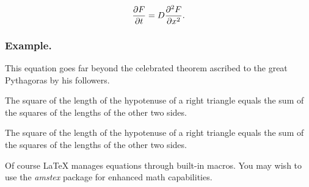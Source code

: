 \documentclass{ifacconf}
\begin{document}
\begin{equation} \label{eq:sample}
{{\partial F}\over {\partial t}} = D{{\partial^2 F}\over {\partial x^2}}.
\end{equation}

\subsubsection{Example.} This equation goes far beyond the
celebrated theorem ascribed to the great Pythagoras by his followers.

\begin{thm}   %
The square of the length of the hypotenuse of a right triangle equals
the sum of the squares of the lengths of the other two sides.
\end{thm}

\begin{pf}    %
The square of the length of the hypotenuse of a right triangle equals the sum of the squares 
of the lengths of the other two sides.
\end{pf}


Of course LaTeX manages equations through built-in macros. You may
wish to use the \textit{amstex} package for enhanced math
capabilities.
\end{document}

